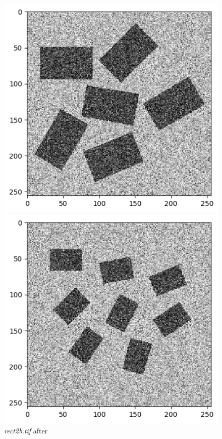 \documentclass[runningheads]{llncs}
\begin{document}
\begin{figure}[h!]
\begin{minipage}[h]{0.47\linewidth}
\begin{center}
\includegraphics[width=1\linewidth]{Report/Result_Images/image_kb2.png} 
\caption{\emph{rect2b.tif} after}
\label{kb2-Kuwahara and Kernel 2}
\end{center}
\end{minipage}
\vfill
\vspace{0.2 cm}
\begin{minipage}[h]{0.47\linewidth}
\begin{center}
\includegraphics[width=1\linewidth]{Report/Result_Images/image_kb3.png} 

\end{center}
\end{minipage}
\end{figure}
\end{document}
